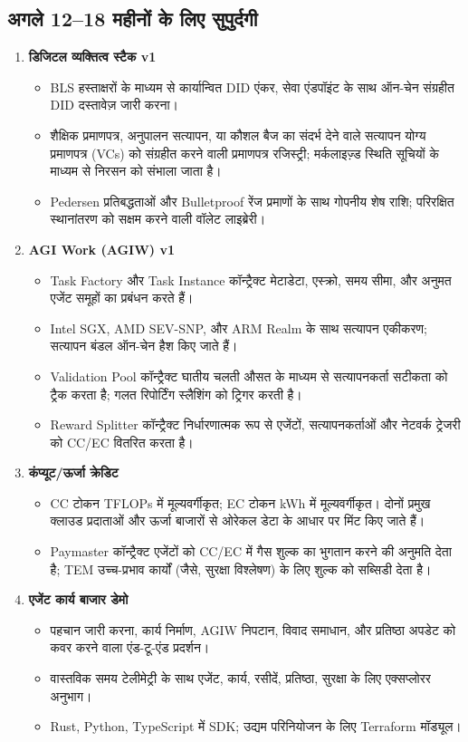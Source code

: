 \documentclass[11pt]{article}
\begin{document}
\subsection{अगले 12--18 महीनों के लिए सुपुर्दगी}
\begin{enumerate}[label=\textbf{D\arabic*.}, leftmargin=*]
  \item \textbf{डिजिटल व्यक्तित्व स्टैक v1}
  \begin{itemize}[noitemsep]
    \item BLS हस्ताक्षरों के माध्यम से कार्यान्वित DID एंकर, सेवा एंडपॉइंट के साथ ऑन-चेन संग्रहीत DID दस्तावेज़ जारी करना।
    \item शैक्षिक प्रमाणपत्र, अनुपालन सत्यापन, या कौशल बैज का संदर्भ देने वाले सत्यापन योग्य प्रमाणपत्र (VCs) को संग्रहीत करने वाली प्रमाणपत्र रजिस्ट्री; मर्कलाइज़्ड स्थिति सूचियों के माध्यम से निरसन को संभाला जाता है।
    \item Pedersen प्रतिबद्धताओं और Bulletproof रेंज प्रमाणों के साथ गोपनीय शेष राशि; परिरक्षित स्थानांतरण को सक्षम करने वाली वॉलेट लाइब्रेरी।
  \end{itemize}
  \item \textbf{AGI Work (AGIW) v1}
  \begin{itemize}[noitemsep]
    \item Task Factory और Task Instance कॉन्ट्रैक्ट मेटाडेटा, एस्क्रो, समय सीमा, और अनुमत एजेंट समूहों का प्रबंधन करते हैं।
    \item Intel SGX, AMD SEV-SNP, और ARM Realm के साथ सत्यापन एकीकरण; सत्यापन बंडल ऑन-चेन हैश किए जाते हैं।
    \item Validation Pool कॉन्ट्रैक्ट घातीय चलती औसत के माध्यम से सत्यापनकर्ता सटीकता को ट्रैक करता है; गलत रिपोर्टिंग स्लैशिंग को ट्रिगर करती है।
    \item Reward Splitter कॉन्ट्रैक्ट निर्धारणात्मक रूप से एजेंटों, सत्यापनकर्ताओं और नेटवर्क ट्रेजरी को CC/EC वितरित करता है।
  \end{itemize}
  \item \textbf{कंप्यूट/ऊर्जा क्रेडिट}
  \begin{itemize}[noitemsep]
    \item CC टोकन TFLOPs में मूल्यवर्गीकृत; EC टोकन kWh में मूल्यवर्गीकृत। दोनों प्रमुख क्लाउड प्रदाताओं और ऊर्जा बाजारों से ओरेकल डेटा के आधार पर मिंट किए जाते हैं।
    \item Paymaster कॉन्ट्रैक्ट एजेंटों को CC/EC में गैस शुल्क का भुगतान करने की अनुमति देता है; TEM उच्च-प्रभाव कार्यों (जैसे, सुरक्षा विश्लेषण) के लिए शुल्क को सब्सिडी देता है।
  \end{itemize}
  \item \textbf{एजेंट कार्य बाजार डेमो}
  \begin{itemize}[noitemsep]
    \item पहचान जारी करना, कार्य निर्माण, AGIW निपटान, विवाद समाधान, और प्रतिष्ठा अपडेट को कवर करने वाला एंड-टू-एंड प्रदर्शन।
    \item वास्तविक समय टेलीमेट्री के साथ एजेंट, कार्य, रसीदें, प्रतिष्ठा, सुरक्षा के लिए एक्सप्लोरर अनुभाग।
    \item Rust, Python, TypeScript में SDK; उद्यम परिनियोजन के लिए Terraform मॉड्यूल।
  \end{itemize}
\end{enumerate}
\end{document}
